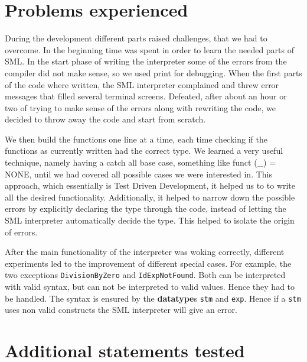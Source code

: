 \documentclass[a4paper]{article}
\begin{document}


\section{Problems experienced}

During the development different parts raised challenges, that we had to overcome. In the beginning time was spent in order to learn the needed parts of SML. In the start phase of writing the interpreter some of the errors from the compiler did not make sense, so we used print for debugging. When the first parts of the code where written, the SML interpreter complained and threw error messages that filled several terminal screens. Defeated, after about an hour or two of trying to make sense of the errors along with rewriting the code, we decided to throw away the code and start from scratch. 

We then build the functions one line at a time, each time checking if the functions as currently written had the correct type. We learned a very useful technique, namely having a catch all base case, something like funct (\_) = NONE, until we had covered all possible cases we were interested in. This approach, which essentially is Test Driven Development, it helped us to to write all the desired functionality. Additionally, it helped to narrow down the possible errors by explicitly declaring the type through the code, instead of letting the SML interpreter automatically decide the type. This helped to isolate the origin of errors.

After the main functionality of the interpreter was woking correctly, different experiments led to the improvement of different special cases. For example, the two exceptions \texttt{DivisionByZero} and \texttt{IdExpNotFound}. Both can be interpreted with valid syntax, but can not be interpreted to valid values. Hence they had to be handled. The syntax is ensured by the \textbf{datatype}s \texttt{stm} and \texttt{exp}. Hence if a \texttt{stm} uses non valid constructs the SML interpreter will give an error.



\section{Additional statements tested}
\end{document}
